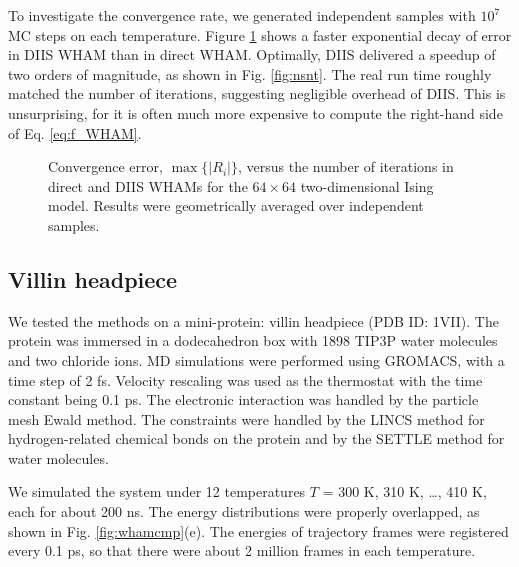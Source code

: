 \documentclass[reprint,aip,jcp,superscriptaddress]{revtex4-1}
\begin{document}
To investigate the convergence rate,
we generated independent samples with
$10^7$ MC steps on each temperature.
%
Figure \ref{fig:is2trace}
shows a faster exponential decay of error
in DIIS WHAM
than in direct WHAM.
%
Optimally, DIIS
delivered a speedup of two orders of magnitude,
as shown in Fig. \ref{fig:nsnt}.
%
The real run time roughly matched
the number of iterations,
suggesting negligible overhead of DIIS.
%
This is unsurprising,
for it is often much more expensive to compute
the right-hand side of Eq. \eqref{eq:f_WHAM}.






\begin{figure}[h]
  \caption{
    \label{fig:is2trace}
    Convergence error, $\max \{ |R_i| \}$,
    versus the number of iterations
    in direct and DIIS WHAMs
    for the $64\times64$ two-dimensional Ising model.
    Results were geometrically averaged over independent samples.
  }
\end{figure}





\subsection{\label{sec:results_villin}
Villin headpiece}



We tested the methods on a mini-protein:
villin headpiece\cite{duan1998}
(PDB ID: 1VII).
%
The protein was immersed in
a dodecahedron box with 1898 TIP3P water molecules and two chloride ions.
%
MD simulations were performed
using GROMACS\cite{
berendsen1995, *lindahl2001, *vanderspoel2005, *hess2008},
with a time step of 2 fs.
%
Velocity rescaling\cite{bussi2007}
was used as the thermostat with
the time constant being 0.1 ps.
%
The electronic interaction was
handled by the particle mesh Ewald method\cite{
essmann1995}.
%
The constraints were handled by the LINCS method\cite{
hess1997}
for hydrogen-related chemical bonds on the protein
and by the SETTLE method\cite{
miyamoto1992}
for water molecules.
%



We simulated the system under 12 temperatures
$T$ = 300 K, 310 K, \dots, 410 K,
each for about 200 ns.
%
The energy distributions were properly overlapped,
as shown in Fig. \ref{fig:whamcmp}(e).
%
The energies of trajectory frames were registered every 0.1 ps,
so that there were about 2 million frames
in each temperature.
\end{document}

